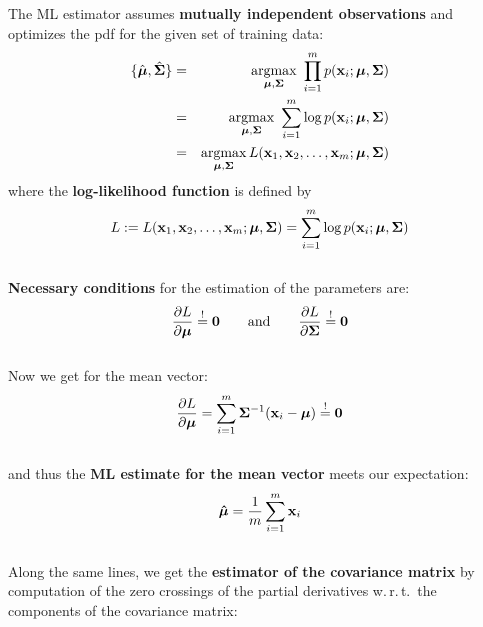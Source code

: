     \small
    The ML estimator assumes   \textbf{mutually independent observations} and optimizes the pdf for the given set of training data:
%
    {\footnotesize
      \begin{eqnarray*}
        \{\hat{\bm{\mathrm{\mu}}}, \hat{\mathbf{\Sigma}}\}
          &=& \operatorname*{argmax}_{\bm{\mathrm{\mu}},\mathbf{\Sigma}}\ \prod_{i=1}^m p(\bm{\mathrm{x}}_i;\bm{\mathrm{\mu}}, \mathbf{\Sigma}) \\   
          &=& \operatorname*{argmax}_{\bm{\mathrm{\mu}},\mathbf{\Sigma}}\ \sum_{i=1}^m \log p(\bm{\mathrm{x}}_i;\bm{\mathrm{\mu}}, \mathbf{\Sigma}) \\  
          &=& \operatorname*{argmax}_{\bm{\mathrm{\mu}},\mathbf{\Sigma}} L(\bm{\mathrm{x}}_1, \bm{\mathrm{x}}_2, \dots, \bm{\mathrm{x}}_m; \bm{\mathrm{\mu}}, \mathbf{\Sigma})  
      \end{eqnarray*}
    }
%
    where the   \textbf{log-likelihood function} is defined by
%
    \begin{displaymath}
        L:= L(\bm{\mathrm{x}}_1, \bm{\mathrm{x}}_2, \dots, \bm{\mathrm{x}}_m; \bm{\mathrm{\mu}}, \mathbf{\Sigma}) =
        \sum_{i=1}^m \log p(\bm{\mathrm{x}}_i;\bm{\mathrm{\mu}}, \mathbf{\Sigma})
      \end{displaymath}\\
    \textbf{Necessary conditions} for the estimation of the parameters are:\\
       \begin{displaymath}
         \frac{\partial L}{\partial \bm{\mathrm{\mu}}} \stackrel{!}{=} \bm{\mathrm{0}} 
         \quad \quad \mbox{and} \quad \quad
         \frac{\partial L}{\partial \mathbf{\Sigma}} \stackrel{!}{=} \mathbf{0}  
       \end{displaymath}\\
     Now we get for the mean vector:\\%
       \begin{displaymath}
         \frac{\partial L}{\partial \bm{\mathrm{\mu}}} = 
         \sum_{i=1}^m \mathbf{\Sigma}^{-1}(\bm{\mathrm{x}}_i-\bm{\mathrm{\mu}}) \stackrel{!}{=} 
         \bm{\mathrm{0}}  
       \end{displaymath}\\
     and thus the   \textbf{ML estimate for the mean vector} meets our expectation:\\
      \begin{displaymath}
         \bm{\mathrm{\hat{\mu}}} = \frac{1}{m}\sum_{i=1}^m \bm{\mathrm{x}}_i
      \end{displaymath}\\
   \small
    Along the same lines, we get the   \textbf{estimator of the covariance matrix} by computation of the zero crossings of the partial derivatives w.\,r.\,t.\ the components of the covariance matrix:
 
